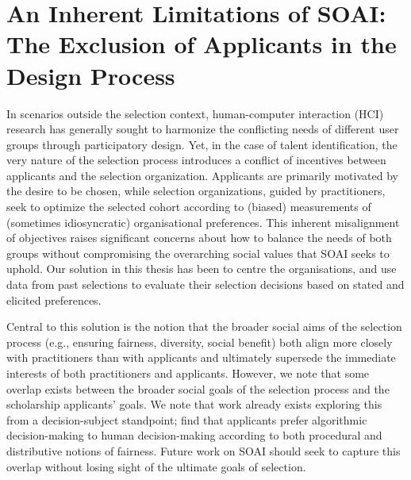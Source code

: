 \section{An Inherent Limitations of SOAI: The Exclusion of Applicants in the Design Process}
In scenarios outside the selection context, human-computer interaction (HCI) research has generally sought to harmonize the conflicting needs of different user groups through participatory design. Yet, in the case of talent identification, the very nature of the selection process introduces a conflict of incentives between applicants and the selection organization. Applicants are primarily motivated by the desire to be chosen, while selection organizations, guided by practitioners, seek to optimize the selected cohort according to (biased) measurements of (sometimes idiosyncratic) organisational preferences. This inherent misalignment of objectives raises significant concerns about how to balance the needs of both groups without compromising the overarching social values that SOAI seeks to uphold. Our solution in this thesis has been to centre the organisations, and use data from past selections to evaluate their selection decisions based on stated and elicited preferences. %

Central to this solution is the notion that the broader social aims of the selection process (e.g., ensuring fairness, diversity, social benefit) both align more closely with practitioners than with applicants and ultimately supersede the immediate interests of both practitioners and applicants. However, we note that some overlap exists between the broader social goals of the selection process and the scholarship applicants' goals. We note that work already exists exploring this from a decision-subject standpoint; \textcite{10.1145/3351095.3372867} find that applicants prefer algorithmic decision-making to human decision-making according to both procedural and distributive notions of fairness. Future work on SOAI should seek to capture this overlap without losing sight of the ultimate goals of selection.

